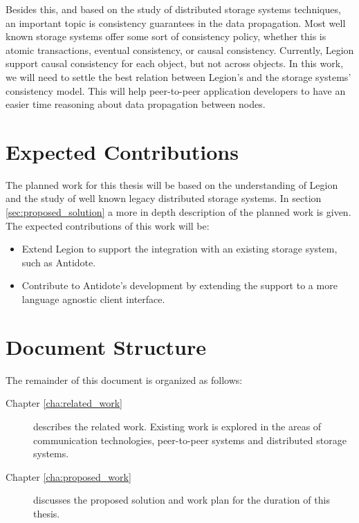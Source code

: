 	Besides this, and based on the study of distributed storage systems techniques, an important topic is consistency guarantees in the data propagation. Most well known storage systems offer some sort of consistency policy, whether this is atomic transactions, eventual consistency, or causal consistency. Currently, Legion support causal consistency for each object, but not across objects. In this work, we will need to settle the best relation between Legion's and the storage systems' consistency model. This will help peer-to-peer application developers to have an easier time reasoning about data propagation between nodes.

\section{Expected Contributions}
\label{sec:expected_contributions}
The planned work for this thesis will be based on the understanding of Legion and the study of well known legacy distributed storage systems. In section \ref{sec:proposed_solution} a more in depth description of the planned work is given. The expected contributions of this work will be:
	
\begin{itemize}
\item Extend Legion to support the integration with an existing storage system, such as Antidote.

\item Contribute to Antidote's development by extending the support to a more language agnostic client interface.

\end{itemize}

\section{Document Structure}
\label{document_structure}
The remainder of this document is organized as follows:\par

\begin{description}
\item[Chapter \ref{cha:related_work}] describes the related work. Existing work is explored in the areas of communication technologies, peer-to-peer systems and distributed storage systems.

\item[Chapter \ref{cha:proposed_work}] discusses the proposed solution and work plan for the duration of this thesis.
\end{description}